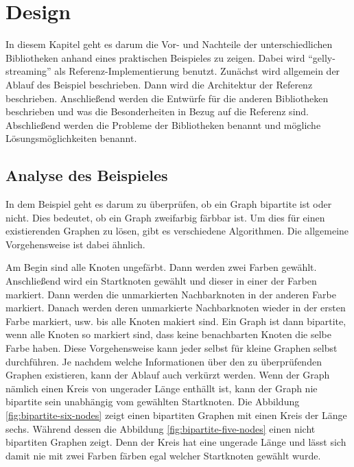 \chapter{Design}
In diesem Kapitel geht es darum die Vor- und Nachteile der unterschiedlichen
Bibliotheken anhand eines praktischen Beispieles zu zeigen. Dabei wird
\enquote{gelly-streaming} als Referenz-Implementierung benutzt. Zunächst wird
allgemein der Ablauf des Beispiel beschrieben. Dann wird die Architektur
der Referenz beschrieben. Anschließend werden die Entwürfe für die anderen
Bibliotheken beschrieben und was die Besonderheiten in Bezug auf die Referenz
sind. Abschließend werden die Probleme der Bibliotheken benannt und mögliche
Lösungsmöglichkeiten benannt.

\section{Analyse des Beispieles}
In dem Beispiel geht es darum zu überprüfen, ob ein Graph bipartite ist oder
nicht. Dies bedeutet, ob ein Graph zweifarbig färbbar ist. Um dies für einen
existierenden Graphen zu lösen, gibt es verschiedene Algorithmen. Die allgemeine
Vorgehensweise ist dabei ähnlich.

Am Begin sind alle Knoten ungefärbt. Dann werden zwei Farben gewählt.
Anschließend wird ein Startknoten gewählt und dieser in einer der Farben markiert.
Dann werden die unmarkierten Nachbarknoten in der anderen Farbe markiert. Danach
werden deren unmarkierte Nachbarknoten wieder in der ersten Farbe markiert, usw.
bis alle Knoten makiert sind. Ein Graph ist dann bipartite, wenn alle Knoten so
markiert sind, dass keine benachbarten Knoten die selbe Farbe haben. Diese
Vorgehensweise kann jeder selbst für kleine Graphen selbst durchführen. Je nachdem
welche Informationen über den zu überprüfenden Graphen existieren, kann der Ablauf
auch verkürzt werden. Wenn der Graph nämlich einen Kreis von ungerader Länge
enthällt ist, kann der Graph nie bipartite sein unabhängig vom gewählten
Startknoten. Die Abbildung \ref{fig:bipartite-six-nodes} zeigt einen bipartiten
Graphen mit einen Kreis der Länge sechs. Während dessen die Abbildung \ref{fig:bipartite-five-nodes}
einen nicht bipartiten Graphen zeigt. Denn der Kreis hat eine ungerade Länge und
lässt sich damit nie mit zwei Farben färben egal welcher Startknoten gewählt
wurde. 

